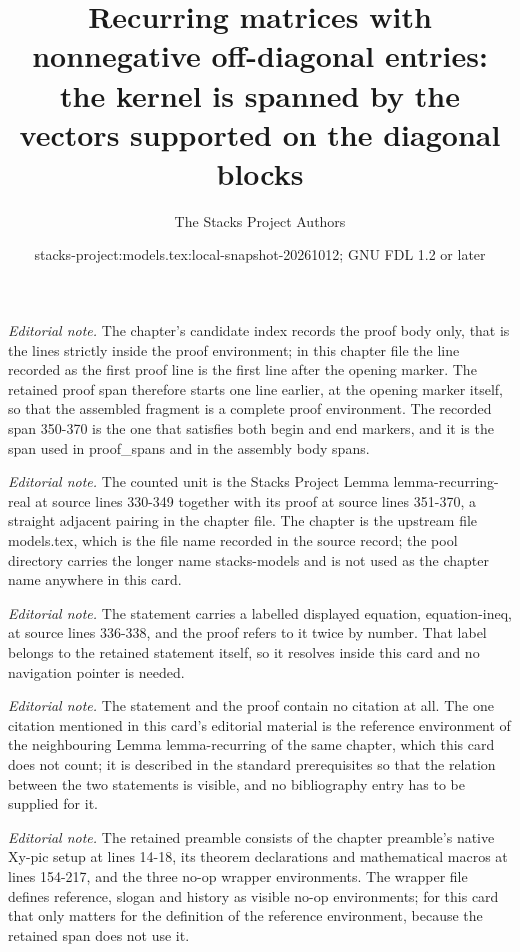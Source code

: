 \documentclass[10pt,a4paper]{amsart}
\title{Recurring matrices with nonnegative off-diagonal entries: the kernel is spanned by the vectors supported on the diagonal blocks}
\author{The Stacks Project Authors}
\date{stacks-project:models.tex:local-snapshot-20261012; GNU FDL 1.2 or later}
\theoremstyle{plain}
\theoremstyle{definition}
\theoremstyle{remark}
\numberwithin{equation}{subsection}
\begin{document}
\maketitle
\noindent\textit{Editorial note.} The chapter's candidate index records the proof body only, that is the lines strictly inside the proof environment; in this chapter file the line recorded as the first proof line is the first line after the opening marker. The retained proof span therefore starts one line earlier, at the opening marker itself, so that the assembled fragment is a complete proof environment. The recorded span 350-370 is the one that satisfies both begin and end markers, and it is the span used in proof\_spans and in the assembly body spans.\par\medskip
\noindent\textit{Editorial note.} The counted unit is the Stacks Project Lemma lemma-recurring-real at source lines 330-349 together with its proof at source lines 351-370, a straight adjacent pairing in the chapter file. The chapter is the upstream file models.tex, which is the file name recorded in the source record; the pool directory carries the longer name stacks-models and is not used as the chapter name anywhere in this card.\par\medskip
\noindent\textit{Editorial note.} The statement carries a labelled displayed equation, equation-ineq, at source lines 336-338, and the proof refers to it twice by number. That label belongs to the retained statement itself, so it resolves inside this card and no navigation pointer is needed.\par\medskip
\noindent\textit{Editorial note.} The statement and the proof contain no citation at all. The one citation mentioned in this card's editorial material is the reference environment of the neighbouring Lemma lemma-recurring of the same chapter, which this card does not count; it is described in the standard prerequisites so that the relation between the two statements is visible, and no bibliography entry has to be supplied for it.\par\medskip
\noindent\textit{Editorial note.} The retained preamble consists of the chapter preamble's native Xy-pic setup at lines 14-18, its theorem declarations and mathematical macros at lines 154-217, and the three no-op wrapper environments. The wrapper file defines reference, slogan and history as visible no-op environments; for this card that only matters for the definition of the reference environment, because the retained span does not use it.\par\medskip
\end{document}
